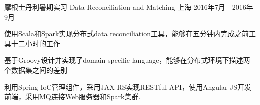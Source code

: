 \cventry
{摩根士丹利暑期实习} %
{Data Reconciliation and Matching} %
{上海} %
{2016年7月 - 2016年9月} %
{ %
\begin{cvitems}
\item {使用Scala和Spark实现分布式data reconciliation工具，能够在五分钟内完成之前工具十二小时的工作}
\item {基于Groovy设计并实现了domain specific language，能够在分布式环境下描述两个数据集之间的差别}
\item {利用Spring IoC管理组件，采用JAX-RS实现RESTful API，使用Angular JS开发前端，采用MQ连接Web服务器和Spark集群.}
\end{cvitems}
}

